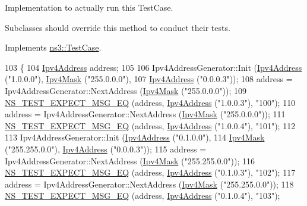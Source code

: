 Implementation to actually run this Test\+Case. 

Subclasses should override this method to conduct their tests. 

Implements \hyperlink{classns3_1_1TestCase_a8ff74680cf017ed42011e4be51917a24}{ns3\+::\+Test\+Case}.


\begin{DoxyCode}
103 \{
104   \hyperlink{classns3_1_1Ipv4Address}{Ipv4Address} address;
105 
106   Ipv4AddressGenerator::Init (\hyperlink{classns3_1_1Ipv4Address}{Ipv4Address} (\textcolor{stringliteral}{"1.0.0.0"}), \hyperlink{classns3_1_1Ipv4Mask}{Ipv4Mask} (\textcolor{stringliteral}{"255.0.0.0"}),
107                               \hyperlink{classns3_1_1Ipv4Address}{Ipv4Address} (\textcolor{stringliteral}{"0.0.0.3"}));
108   address = Ipv4AddressGenerator::NextAddress (\hyperlink{classns3_1_1Ipv4Mask}{Ipv4Mask} (\textcolor{stringliteral}{"255.0.0.0"}));
109   \hyperlink{group__testing_ga7304ba46a28d8cf08dfdfd6499cf7068}{NS\_TEST\_EXPECT\_MSG\_EQ} (address, \hyperlink{classns3_1_1Ipv4Address}{Ipv4Address} (\textcolor{stringliteral}{"1.0.0.3"}), \textcolor{stringliteral}{"100"});
110   address = Ipv4AddressGenerator::NextAddress (\hyperlink{classns3_1_1Ipv4Mask}{Ipv4Mask} (\textcolor{stringliteral}{"255.0.0.0"}));
111   \hyperlink{group__testing_ga7304ba46a28d8cf08dfdfd6499cf7068}{NS\_TEST\_EXPECT\_MSG\_EQ} (address, \hyperlink{classns3_1_1Ipv4Address}{Ipv4Address} (\textcolor{stringliteral}{"1.0.0.4"}), \textcolor{stringliteral}{"101"});
112 
113   Ipv4AddressGenerator::Init (\hyperlink{classns3_1_1Ipv4Address}{Ipv4Address} (\textcolor{stringliteral}{"0.1.0.0"}),
114                               \hyperlink{classns3_1_1Ipv4Mask}{Ipv4Mask} (\textcolor{stringliteral}{"255.255.0.0"}), \hyperlink{classns3_1_1Ipv4Address}{Ipv4Address} (\textcolor{stringliteral}{"0.0.0.3"}));
115   address = Ipv4AddressGenerator::NextAddress (\hyperlink{classns3_1_1Ipv4Mask}{Ipv4Mask} (\textcolor{stringliteral}{"255.255.0.0"}));
116   \hyperlink{group__testing_ga7304ba46a28d8cf08dfdfd6499cf7068}{NS\_TEST\_EXPECT\_MSG\_EQ} (address, \hyperlink{classns3_1_1Ipv4Address}{Ipv4Address} (\textcolor{stringliteral}{"0.1.0.3"}), \textcolor{stringliteral}{"102"});
117   address = Ipv4AddressGenerator::NextAddress (\hyperlink{classns3_1_1Ipv4Mask}{Ipv4Mask} (\textcolor{stringliteral}{"255.255.0.0"}));
118   \hyperlink{group__testing_ga7304ba46a28d8cf08dfdfd6499cf7068}{NS\_TEST\_EXPECT\_MSG\_EQ} (address, \hyperlink{classns3_1_1Ipv4Address}{Ipv4Address} (\textcolor{stringliteral}{"0.1.0.4"}), \textcolor{stringliteral}{"103"});

\end{DoxyCode}
